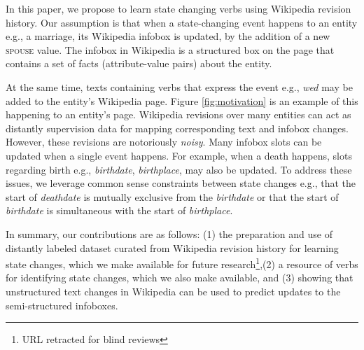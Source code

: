   

In this paper, we propose to learn state changing verbs using Wikipedia revision history. Our assumption is that when a state-changing event happens to an entity e.g., a marriage, its Wikipedia infobox is updated, by the addition of a new \textsc{spouse} value. The infobox in Wikipedia is  a structured box on the page that contains a set of facts (attribute-value pairs) about the entity. 

At the same time, texts containing verbs that express the event e.g., \textit{wed} may be added to the entity's Wikipedia page.  Figure \ref{fig:motivation} is an example of this happening to an entity's page. Wikipedia revisions over many entities can act as distantly supervision  data for mapping corresponding text and infobox changes. However, these revisions are notoriously  \textit{noisy}.  Many infobox slots can be  updated when a single event happens.
For example, when a death happens, slots regarding birth e.g., \textit{birthdate}, \textit{birthplace}, may also be updated. To address these issues, we leverage common sense constraints between state changes e.g., that the start of \textit{deathdate} is mutually exclusive from the \textit{birthdate} or that the start of \textit{birthdate} is simultaneous with the start of \textit{birthplace}.

In summary, our contributions are as follows: (1) the preparation and use of  distantly labeled dataset curated from Wikipedia revision history for learning state changes, which we make available for future research\footnote{URL retracted for blind reviews},(2) a resource of verbs for identifying state changes, which we also make available, and (3) showing that unstructured text changes in Wikipedia can be used to predict updates to the semi-structured infoboxes. 
